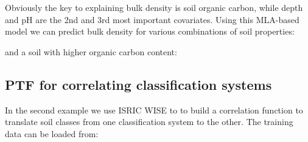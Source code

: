 \documentclass[graybox,natbib,nospthms,UStrade]{svmono}
\newenvironment{Shaded}{\begin{snugshade}}{\end{snugshade}}
\newcommand{\CommentTok}[1]{\textcolor[rgb]{0.37,0.37,0.37}{\textit{#1}}}
\newcommand{\DataTypeTok}[1]{\textcolor[rgb]{0.27,0.27,0.27}{#1}}
\newcommand{\DecValTok}[1]{\textcolor[rgb]{0.06,0.06,0.06}{#1}}
\newcommand{\FloatTok}[1]{\textcolor[rgb]{0.06,0.06,0.06}{#1}}
\newcommand{\KeywordTok}[1]{\textcolor[rgb]{0.27,0.27,0.27}{\textbf{#1}}}
\newcommand{\NormalTok}[1]{#1}
\newcommand{\OperatorTok}[1]{\textcolor[rgb]{0.43,0.43,0.43}{\textbf{#1}}}
\begin{document}
Obviously the key to explaining bulk density is soil organic carbon, while depth and pH are the 2nd and 3rd most important covariates. Using this MLA-based model we can predict bulk density for various combinations of soil properties:

\begin{Shaded}
\end{Shaded}

and a soil with higher organic carbon content:

\begin{Shaded}
\end{Shaded}

\hypertarget{ptf-for-correlating-classification-systems}{%
\subsection{PTF for correlating classification systems}\label{ptf-for-correlating-classification-systems}}

In the second example we use ISRIC WISE to to build a correlation function to translate soil classes from one classification system to the other. The training data can be loaded from:
\end{document}
